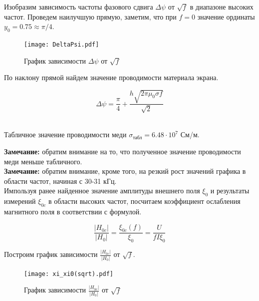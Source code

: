     \begin{center}
    \end{center}

    Изобразим зависимость частоты фазового сдвига $\Delta \psi$ от $\sqrt{f}$ в диапазоне высоких частот.
    Проведем наилучшую прямую, заметим, что при $f = 0$ значение ординаты $y_0 = 0.75 \approx \pi/4$.

    \begin{figure}
        \centering
        \texttt{[image: DeltaPsi.pdf]}
        \caption{График зависимости $\Delta \psi$ от $\sqrt{f}$}
        \label{DeltaPsi}
    \end{figure}

    По наклону прямой найдем значение проводимости материала экрана.

    \begin{equation}
        \Delta \psi = \frac{\pi}{4} + \frac{h \sqrt{2 \pi \mu_0 \sigma f}}{\sqrt{2}}
    \end{equation}

    \begin{center}
         \\
        Табличное значение проводимости меди $\sigma_{\text{табл}} = 6.48 \cdot 10^7$ См/м.
    \end{center}

    \textbf{Замечание:} обратим внимание на то, что полученное значение проводимости меди меньше табличного. %
    \\

    \textbf{Замечание:} обратим внимание, кроме того, на резкий рост значений графика в области частот, начиная с 30-31 кГц. %
    \\

    Импользуя ранее найденное значение амплитуды внешнего поля $\xi_0$ и результаты измерений $\xi_{0c}$
    в области высоких частот, посчитаем коэффициент ослабления магнитного поля в соответствии с формулой.

    \begin{equation}
        \frac{|H_{0c}|}{|H_{0}|} = \frac{\xi_{0c}(f)}{\xi_0} = \frac{U}{f I \xi_0}
    \end{equation}

    Построим график зависимости $\frac{|H_{0c}|}{|H_{0}|}$ от $\sqrt{f}$.

    \begin{figure}
        \centering
        \texttt{[image: xi\_xi0(sqrt).pdf]}
        \caption{График зависимости $\frac{|H_{0c}|}{|H_{0}|}$ от $\sqrt{f}$}
        \label{xi_xi0(sqrt)}
    \end{figure}

